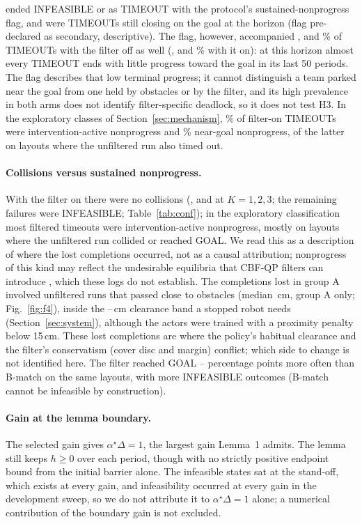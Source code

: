 \documentclass[journal]{IEEEtran}
\begin{document}
ended INFEASIBLE or as TIMEOUT with the protocol's sustained-nonprogress flag, and \HthreeMovingAll{} were TIMEOUTs
still closing on the goal at the horizon (flag pre-declared as secondary, descriptive). The flag,
however, accompanied \OffStallOfTOone, \OffStallOfTOtwo{} and \OffStallOfTOthree\% of TIMEOUTs with the
filter off as well (\OnStallOfTOone, \OnStallOfTOtwo{} and \OnStallOfTOthree\% with it on): at this
horizon almost every TIMEOUT ends with little progress toward the goal in its last 50 periods. The flag
describes that low terminal progress; it cannot distinguish a team parked near the goal from one held
by obstacles or by the filter, and its high prevalence in both arms does not identify filter-specific
deadlock, so it does not test H3. In the exploratory classes of Section~\ref{sec:mechanism}, \TOfiPct\% of
filter-on TIMEOUTs were intervention-active nonprogress and \TOngPct\% near-goal nonprogress, \TOngOffTO{}
of the latter on layouts where the unfiltered run also timed out.

\paragraph{Collisions versus sustained nonprogress.} With the filter on there were no collisions (\CollOnone,
\CollOntwo{} and \CollOnthree{} at $K=1,2,3$; the remaining failures were INFEASIBLE;
Table~\ref{tab:conf}); in the exploratory classification most filtered timeouts were
intervention-active nonprogress, mostly on layouts where the unfiltered run collided or reached GOAL. We read
this as a description of where the lost completions occurred, not as a causal attribution; nonprogress of
this kind may reflect the undesirable equilibria that CBF-QP filters can introduce \cite{reis2021}, which
these logs do not establish. The completions lost in group A involved unfiltered runs that passed close to obstacles
(median \GapAmedCm\,cm, group A only; Fig.~\ref{fig:f4}), inside the \CoverBandLoCm--\CoverBandHiCm\,cm
clearance band a stopped robot needs (Section~\ref{sec:system}), although the actors were trained with a
proximity penalty below 15\,cm. These lost completions are where the policy's habitual clearance and the
filter's conservatism (cover disc and margin) conflict; which side to change is not identified here.
The filter reached GOAL \OnBmGoalMin--\OnBmGoalMax{} percentage points more often than B-match on the
same layouts, with more INFEASIBLE outcomes (B-match cannot be infeasible by construction).

\paragraph{Gain at the lemma boundary.} The selected gain gives $\alpha^\star\Delta=1$, the largest gain
Lemma~1 admits. The lemma still keeps $h\ge0$ over each period, though with no strictly positive
endpoint bound from the initial barrier alone. The infeasible states sat at the stand-off, which exists
at every gain, and infeasibility occurred at every gain in the development sweep, so we do not attribute
it to $\alpha^\star\Delta=1$ alone; a numerical contribution of the boundary gain is not excluded.
\end{document}
